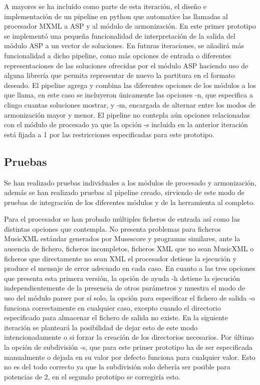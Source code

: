A mayores se ha incluído como parte de esta iteración, el diseño e implementación de un pipeline en python que automatice las llamadas al procesador MXML a ASP y al módulo de armonización. En este primer prototipo se implementó una pequeña funcionalidad de interpretación de la salida del módulo ASP a un vector de soluciones. En futuras iteraciones, se añadirá más funcionalidad a dicho pipeline, como más opciones de entrada o diferentes representaciones de las soluciones ofrecidas por el módulo ASP haciendo uso de alguna librería que permita representar de nuevo la partitura en el formato deseado. El pipeline agrega y combina las diferentes opciones de los módulos a los que llama, en este caso se incluyeron únicamente las opciones -n, que especifica a clingo cuantas soluciones mostrar, y -m, encargada de alternar entre los modos de armonización mayor y menor. El pipeline no contepla aún opciones relacionadas con el módulo de procesado ya que la opción -s incluida en la anterior iteración está fijada a 1 por las restricciones especificadas para este prototipo. 

\subsection{Pruebas}
\label{subsec:second_iteration_test}
Se han realizado pruebas individuales a los módulos de procesado y armonización, además se han realizado pruebas al pipeline creado, sirviendo de este modo de pruebas de integración de los diferentes módulos y de la herramienta al completo.

Para el procesador se han probado múltiples ficheros de entrada así como las distintas opciones que contempla. No presenta problemas para ficheros MusicXML estándar generados por Musescore y programas similares, ante la ausencia de fichero, ficheros incompletos, ficheros XML que no sean MusicXML o ficheros que directamente no sean XML el procesador detiene la ejecución y produce el mensaje de error adecuado en cada caso. En cuanto a las tres opciones que presenta esta primera versión, la opción de ayuda -h detiene la ejecución independientemente de la presencia de otros parámetros y muestra el modo de uso del módulo parser por sí solo, la opción para especificar el fichero de salida -o funciona correctamente en cualquier caso, excepto cuando el directorio especificado para almacenar el fichero de salida no existe. En la siguiente iteración se planteará la posibilidad de dejar esto de este modo intencionadamente o si forzar la creación de los directorios necesarios. Por último la opción de subdivisión -s, que para este primer prototipo ha de ser especificada manualmente o dejada en su valor por defecto funciona para cualquier valor. Esto no es del todo correcto ya que la subdivisión solo debería ser posible para potencias de 2, en el segundo prototipo se corregiría esto.

